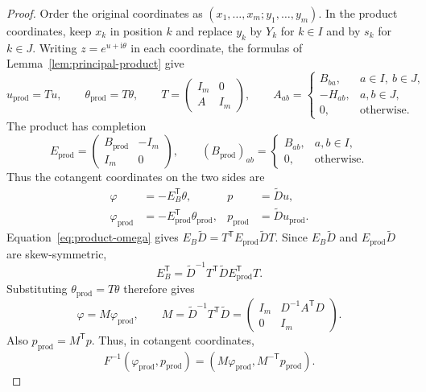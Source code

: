 \documentclass[12pt, letter]{amsart}
\theoremstyle{definition}
\numberwithin{equation}{section}
\begin{document}
\begin{proof}
Order the original coordinates as $(x_1,\ldots,x_m;y_1,\ldots,y_m)$.
In the product coordinates, keep $x_k$ in position $k$ and replace $y_k$
by $Y_k$ for $k\in I$ and by $s_k$ for $k\in J$.
Writing $z=e^{u+\mathrm i\theta}$ in each coordinate, the formulas
of Lemma~\ref{lem:principal-product} give
\[
 u_{\mathrm{prod}}=Tu,\qquad\theta_{\mathrm{prod}}=T\theta,\qquad
 T=\begin{pmatrix}I_m&0\\ A&I_m\end{pmatrix},\qquad
 A_{ab}=\begin{cases}
 B_{ba},&a\in I,\ b\in J,\\
 -H_{ab},&a,b\in J,\\
 0,&\text{otherwise}.
 \end{cases}
\]
The product has completion
\[
 E_{\mathrm{prod}}=\begin{pmatrix}B_{\mathrm{prod}}&-I_m\\I_m&0\end{pmatrix},
 \qquad (B_{\mathrm{prod}})_{ab}
 =\begin{cases}B_{ab},&a,b\in I,\\0,&\text{otherwise}.
 \end{cases}
\]
Thus the cotangent coordinates on the two sides are
\[
 \begin{aligned}
 \varphi&=-E_B^{\mathsf T}\theta,&p&=\widetilde D u,\\
 \varphi_{\mathrm{prod}}&=-E_{\mathrm{prod}}^{\mathsf T}\theta_{\mathrm{prod}},
 &p_{\mathrm{prod}}&=\widetilde D u_{\mathrm{prod}}.
 \end{aligned}
\]
Equation~\eqref{eq:product-omega} gives
$E_B\widetilde D=T^{\mathsf T}E_{\mathrm{prod}}\widetilde D T$.
Since $E_B\widetilde D$ and $E_{\mathrm{prod}}\widetilde D$ are skew-symmetric,
\[
 E_B^{\mathsf T}
 =\widetilde D^{-1}T^{\mathsf T}\widetilde D
       E_{\mathrm{prod}}^{\mathsf T}T.
\]
Substituting $\theta_{\mathrm{prod}}=T\theta$ therefore gives
\begin{equation}\label{eq:angle-map}
 \varphi=M\varphi_{\mathrm{prod}},\qquad
 M=\widetilde D^{-1}T^{\mathsf T}\widetilde D
   =\begin{pmatrix}I_m&D^{-1}A^{\mathsf T}D\\0&I_m\end{pmatrix}.
\end{equation}
Also $p_{\mathrm{prod}}=M^{\mathsf T}p$.
Thus, in cotangent coordinates,
\[
 F^{-1}(\varphi_{\mathrm{prod}},p_{\mathrm{prod}})
   =(M\varphi_{\mathrm{prod}},M^{-\mathsf T}p_{\mathrm{prod}}).
\]


\end{proof}
\end{document}

